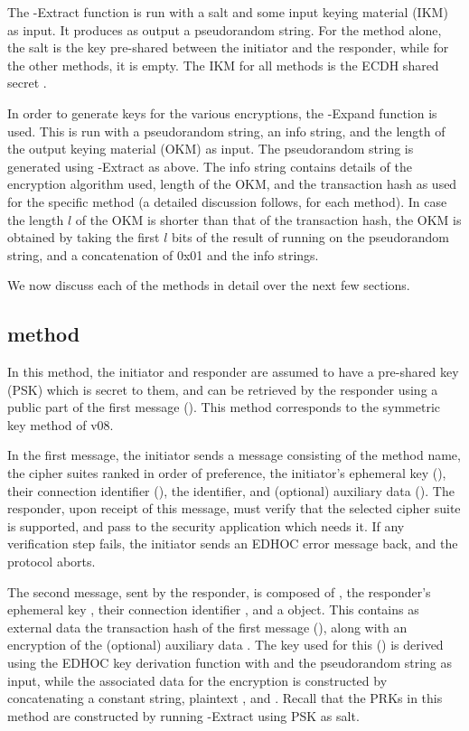 The \mHkdf-Extract function is run with a salt and some input keying material (IKM) as input. It produces as output a pseudorandom string. For the \mPskPsk method alone, the salt is the key pre-shared between the initiator and the responder, while for the other methods, it is empty. The IKM for all \mEdhoc methods is the ECDH shared secret \mGxy.

In order to generate keys for the various encryptions, the \mHkdf-Expand function is used. This is run with a pseudorandom string, an info string, and the length of the output keying material (OKM) as input. The pseudorandom string is generated using \mHkdf-Extract as above. The info string contains details of the \mAead encryption algorithm used, length of the OKM, and the transaction hash as used for the specific method (a detailed discussion follows, for each method). In case the length $l$ of the OKM is shorter than that of the transaction hash, the OKM is obtained by taking the first $l$ bits of the result of running \mHmac on the pseudorandom string, and a concatenation of 0x01 and the info strings.

We now discuss each of the \mEdhoc methods in detail over the next few sections.

\subsection{\mPskPsk method}
In this method, the initiator and responder are assumed to have a pre-shared key (PSK) which is secret to them, and can be retrieved by the responder using a public part of the first message (\mIDPSK). This method corresponds to the symmetric key method of \mEdhoc v08. 

In the first message, the initiator sends a message consisting of the method name, the cipher suites ranked in order of preference, the initiator's ephemeral key (\mGx), their connection identifier (\mCi), the \mIDPSK identifier, and (optional) auxiliary data (\mADone). The responder, upon receipt of this message, must verify that the selected cipher suite is supported,  and pass \mADone to the security application which needs it. If any verification step fails, the initiator sends an EDHOC error message back, and the protocol aborts.

The second message, sent by the responder, is composed of \mCi, the responder's ephemeral key \mGy, their connection identifier \mCr, and a \mCose object. This contains as external data the transaction hash of the first message (\mTHtwo), along with an \mAead encryption of the (optional) auxiliary data \mADtwo. The key used for this (\mKtwo) is derived using the EDHOC key derivation function with \mTHtwo and the pseudorandom string \mPRKtwo as input, while the associated data for the \mAead encryption is constructed by concatenating a constant string, plaintext \mhplain, and \mTHtwo. Recall that the PRKs in this method are constructed by running \mHkdf-Extract using PSK as salt. 

